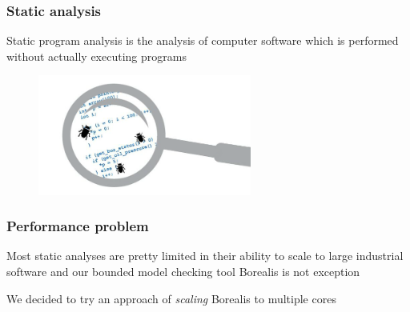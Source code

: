 

\begin{frame}
	\frametitle{Static analysis}

	\begin{block}{}
	\centering
	Static program analysis is the analysis of computer software which is performed without actually executing programs
	\end{block}
		
	\begin{figure}
	\includegraphics[width=70mm]{image/staticAnalysis}
	\end{figure}	
	
\end{frame}



\begin{frame}
	\frametitle{Performance problem}

	\begin{block}{}
		\centering
			Most static analyses are pretty limited in their ability to scale to large industrial software and our bounded model checking tool Borealis is not exception 
	\end{block}

	\begin{block}{}
		\centering
		We decided to try an approach of \textit{scaling} Borealis to multiple cores
	\end{block}
\end{frame}


